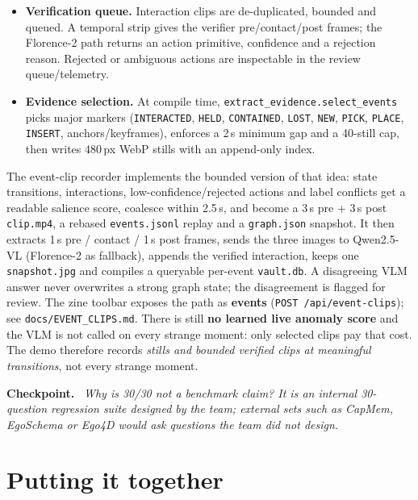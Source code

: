 \documentclass[10pt,a4paper]{article}
\makeatletter
\newcommand{\code}[1]{\texttt{\small #1}}
\newcommand{\needspace}[1]{%
  \par\penalty-100
  \begingroup
  \dimen@=#1\relax
  \ifdim\pagegoal<\maxdimen
    \advance\dimen@\pagetotal
    \ifdim\dimen@>\pagegoal
      \vfil\break
    \fi
  \fi
  \endgroup}
\newenvironment{checkpoint}
  {\par\medskip\noindent\colorbox{accent!5}\bgroup
     \begin{minipage}{\dimexpr\linewidth-2\fboxsep\relax}
     \vspace{3pt}\textbf{\textcolor{accent}{Checkpoint.}}\ \itshape}
  {\vspace{3pt}\end{minipage}\egroup\par\medskip}
\makeatother
\begin{document}
\begin{itemize}[leftmargin=1.2em,itemsep=1pt]
  \item \textbf{Verification queue.} Interaction clips are de-duplicated, bounded and queued. A
        temporal strip gives the verifier pre/contact/post frames; the Florence-2 path returns an
        action primitive, confidence and a rejection reason. Rejected or ambiguous actions are
        inspectable in the review queue/telemetry.
  \item \textbf{Evidence selection.} At compile time, \code{extract\_evidence.select\_events} picks
        major markers (\code{INTERACTED}, \code{HELD}, \code{CONTAINED}, \code{LOST}, \code{NEW},
        \code{PICK}, \code{PLACE}, \code{INSERT}, anchors/keyframes), enforces a 2\,s minimum gap
        and a 40-still cap, then writes 480\,px WebP stills with an append-only index.
\end{itemize}

\noindent
The event-clip recorder implements the bounded version of that idea: state transitions, interactions,
low-confidence/rejected actions and label conflicts get a readable salience score, coalesce within
2.5\,s, and become a 3\,s pre + 3\,s post \code{clip.mp4}, a rebased \code{events.jsonl} replay and
a \code{graph.json} snapshot. It then extracts 1\,s pre / contact / 1\,s post frames, sends the
three images to Qwen2.5-VL (Florence-2 as fallback), appends the verified interaction, keeps one
\code{snapshot.jpg} and compiles a queryable per-event \code{vault.db}. A disagreeing VLM answer
never overwrites a strong graph state; the disagreement is flagged for review. The zine toolbar
exposes the path as \textbf{events} (\code{POST /api/event-clips}); see
\code{docs/EVENT\_CLIPS.md}. There is still \textbf{no learned live anomaly score} and the VLM is
not called on every strange moment: only selected clips pay that cost. The demo therefore records
\emph{stills and bounded verified clips at meaningful transitions}, not every strange moment.

\begin{checkpoint}
Why is 30/30 not a benchmark claim? \emph{It is an internal 30-question regression suite designed by
the team; external sets such as CapMem, EgoSchema or Ego4D would ask questions the team did not
design.}
\end{checkpoint}

\needspace{9\baselineskip}
\part{Putting it together}
\end{document}
